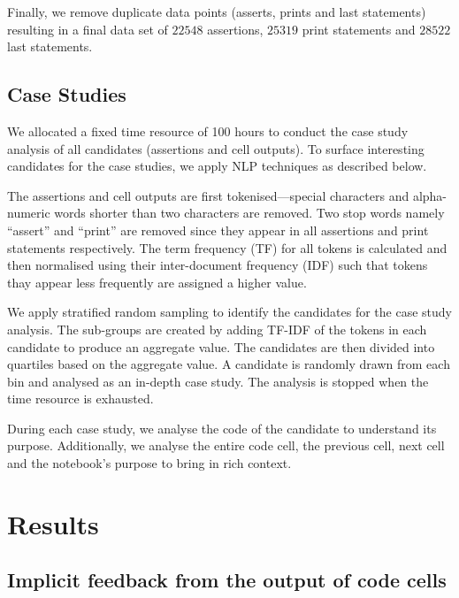 Finally, we remove duplicate data points (asserts, prints and last statements) resulting in a final data set of $22548$ assertions, $25319$ print statements and $28522$ last statements.

\subsection{Case Studies}


We allocated a fixed time resource of 100 hours to conduct the case study analysis of all candidates (assertions and cell outputs). To surface interesting candidates for the case studies, we apply NLP techniques as described below.


The assertions and cell outputs are first tokenised---special characters and alpha-numeric words shorter than two characters are removed. Two stop words namely ``assert'' and ``print'' are removed since they appear in all assertions and print statements respectively. The term frequency (TF) for all tokens is calculated and then normalised using their inter-document frequency (IDF) such that tokens thay appear less frequently are assigned a higher value.

We apply stratified random sampling to identify the candidates for the case study analysis. The sub-groups are created by adding TF-IDF of the tokens in each candidate to produce an aggregate value. The candidates are then divided into quartiles based on the aggregate value. A candidate is randomly drawn from each bin and analysed as an in-depth case study. The analysis is stopped when the time resource is exhausted.

During each case study, we analyse the code of the candidate to understand its purpose. Additionally, we analyse the entire code cell, the previous cell, next cell and the notebook's purpose to bring in rich context.

\section{Results}

\subsection{Implicit feedback from the output of code cells}

